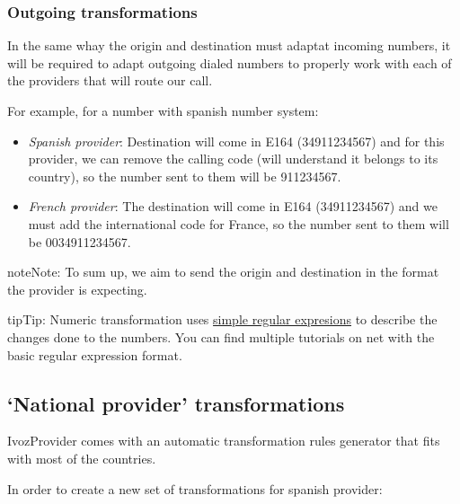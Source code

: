 \documentclass[letterpaper,10pt,english]{sphinxmanual}
\begin{document}
\subsubsection{Outgoing transformations}
\label{external_incoming_calls/numeric_transformations:outgoing-transformations}
In the same whay the origin and destination must adaptat incoming numbers, it
will be required to adapt outgoing dialed numbers to properly work with each
of the providers that will route our call.

For example, for a number with spanish number system:
\begin{itemize}
\item {} 
\emph{Spanish provider}: Destination will come in E164 (34911234567) and for this
provider, we can remove the calling code (will understand it belongs to
its country), so the number sent to them will be 911234567.

\item {} 
\emph{French provider}: The destination will come in E164 (34911234567) and we must
add the international code for France, so the number sent to them will be
0034911234567.

\end{itemize}

\begin{notice}{note}{Note:}
To sum up, we aim to send the origin and destination in the format the
provider is expecting.
\end{notice}

\begin{notice}{tip}{Tip:}
Numeric transformation uses \href{https://es.wikipedia.org/wiki/Expresi\%C3\%B3n\_regular}{simple regular expresions} to describe the
changes done to the numbers. You can find multiple tutorials on net with the
basic regular expression format.
\end{notice}


\subsection{`National provider' transformations}
\label{external_incoming_calls/numeric_transformations:national-provider-transformations}
IvozProvider comes with an automatic transformation rules generator that fits
with most of the countries.

In order to create a new set of transformations for spanish provider:

\end{document}
